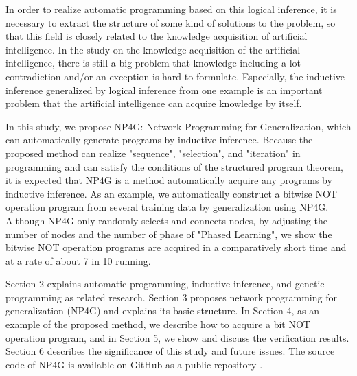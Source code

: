\documentclass{article}
\begin{document}
In order to realize automatic programming based on this logical inference, it is necessary to extract the structure of some kind of solutions to the problem, so that this field is closely related to the knowledge acquisition of artificial intelligence.
In the study on the knowledge acquisition of the artificial intelligence, there is still a big problem that knowledge including a lot contradiction and/or an exception is hard to formulate.
Especially, the inductive inference generalized by logical inference from one example is an important problem that the artificial intelligence can acquire knowledge by itself.

In this study, we propose NP4G: Network Programming for Generalization, which can automatically generate programs by inductive inference.
Because the proposed method can realize "sequence", "selection", and "iteration" in programming and can satisfy the conditions of the structured program theorem, it is expected that NP4G is a method automatically acquire any programs by inductive inference.
As an example, we automatically construct a bitwise NOT operation program from several training data by generalization using NP4G.
Although NP4G only randomly selects and connects nodes, by adjusting the number of nodes and the number of phase of "Phased Learning", we show the bitwise NOT operation programs are acquired in a comparatively short time and at a rate of about 7 in 10 running.

Section 2 explains automatic programming, inductive inference, and genetic programming as related research.
Section 3 proposes network programming for generalization (NP4G) and explains its basic structure.
In Section 4, as an example of the proposed method, we describe how to acquire a bit NOT operation program, and in Section 5, we show and discuss the verification results.
Section 6 describes the significance of this study and future issues.
The source code of NP4G is available on GitHub as a public repository \footnotemark[1]. 
\end{document}
